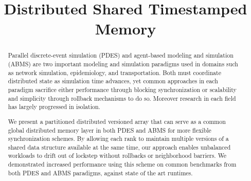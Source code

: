 \title{Distributed Shared Timestamped Memory}


\author{
}

\maketitle

\thispagestyle{fancy} 
\lhead{} 
\rhead{} 
\chead{} 
\rfoot{} 
\cfoot{} 
\renewcommand{\headrulewidth}{0pt} 
\renewcommand{\footrulewidth}{0pt} 

\begin{abstract}

Parallel discrete-event simulation (PDES) and agent-based modeling and simulation (ABMS) are two important modeling and simulation paradigms used in domains such as network simulation, 
epidemiology, and transportation. Both must coordinate distributed state as simulation time
advances, yet common approaches in each paradigm sacrifice
either performance through blocking synchronization or scalability and simplicity
through rollback mechanisms to do so. Moreover research in each field has largely progressed in isolation.

We present a partitioned distributed versioned array that can serve as a
common global distributed memory layer in both PDES and ABMS for more flexible synchronization
schemes. By allowing each rank to maintain multiple versions of a shared
data structure available at the same time, our approach enables unbalanced
workloads to drift out of lockstep without rollbacks or neighborhood barriers.
We demonstrated increased performance using this scheme on common benchmarks
from both PDES and ABMS paradigms, against state of the art runtimes.

\end{abstract}

